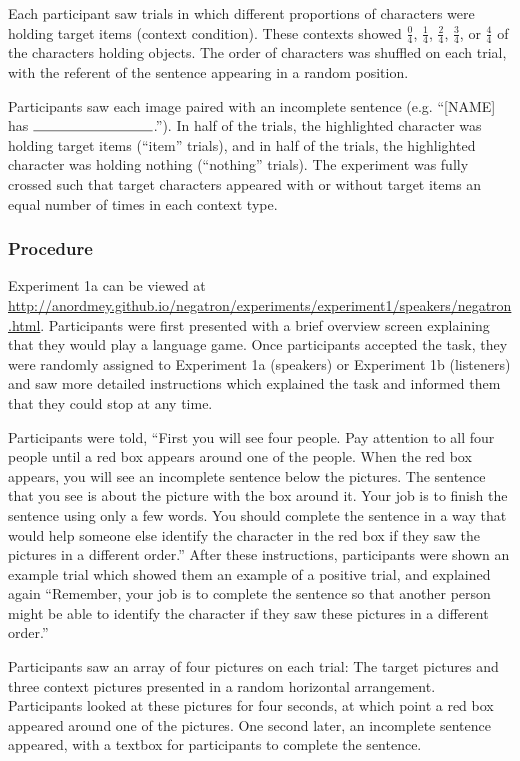 \documentclass[man, floatsintext, noapacite]{apa6}
\begin{document}
Each participant saw trials in which different proportions of characters were holding target items (context condition).  These contexts showed $\frac{0}{4}$, $\frac{1}{4}$, $\frac{2}{4}$, $\frac{3}{4}$, or $\frac{4}{4}$ of the characters holding objects. The order of characters was shuffled on each trial, with the referent of the sentence appearing in a random position. 

Participants saw each image paired with an incomplete sentence (e.g. ``[NAME] has $\rule{3cm}{0.15mm}$.''). In half of the trials, the highlighted character was holding target items (``item'' trials), and in half of the trials, the highlighted character was holding nothing (``nothing'' trials).  The experiment was fully crossed such that target characters appeared with or without target items an equal number of times in each context type.  

\subsubsection{Procedure}

Experiment 1a can be viewed at \url{http://anordmey.github.io/negatron/experiments/experiment1/speakers/negatron.html}. Participants were first presented with a brief overview screen explaining that they would play a language game.  Once participants accepted the task, they were randomly assigned to Experiment 1a (speakers) or Experiment 1b (listeners) and saw more detailed instructions which explained the task and informed them that they could stop at any time. 

Participants were told, ``First you will see four people. Pay attention to all four people until a red box appears around one of the people. When the red box appears, you will see an incomplete sentence below the pictures. The sentence that you see is about the picture with the box around it. Your job is to finish the sentence using only a few words. You should complete the sentence in a way that would help someone else identify the character in the red box if they saw the pictures in a different order.'' After these instructions, participants were shown an example trial which showed them an example of a positive trial, and explained again ``Remember, your job is to complete the sentence so that another person might be able to identify the character if they saw these pictures in a different order.''

Participants saw an array of four pictures on each trial: The target pictures and three context pictures presented in a random horizontal arrangement.  Participants looked at these pictures for four seconds, at which point a red box appeared around one of the pictures.  One second later, an incomplete sentence appeared, with a textbox for participants to complete the sentence. 
\end{document}
